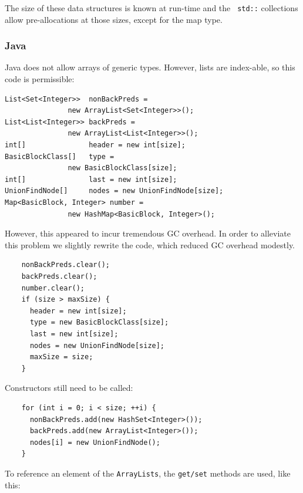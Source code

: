 The size of these data structures is known at run-time and the {\tt
  std::} collections allow pre-allocations at those sizes, except for
the map type.

\subsubsection{Java} 

Java does not allow arrays of generic types. However, lists are
index-able, so this code is permissible:

\begin{footnotesize}
\begin{verbatim}
List<Set<Integer>>  nonBackPreds = 
               new ArrayList<Set<Integer>>();
List<List<Integer>> backPreds = 
               new ArrayList<List<Integer>>();
int[]               header = new int[size];
BasicBlockClass[]   type = 
               new BasicBlockClass[size];
int[]               last = new int[size];
UnionFindNode[]     nodes = new UnionFindNode[size];
Map<BasicBlock, Integer> number = 
               new HashMap<BasicBlock, Integer>();
\end{verbatim}
\end{footnotesize}

However, this appeared to incur tremendous GC overhead. In order to
alleviate this problem we slightly rewrite the code, which reduced GC
overhead modestly.

\begin{footnotesize}
\begin{verbatim}
    nonBackPreds.clear();
    backPreds.clear();
    number.clear();
    if (size > maxSize) {
      header = new int[size];
      type = new BasicBlockClass[size];
      last = new int[size];
      nodes = new UnionFindNode[size];
      maxSize = size;
    }
\end{verbatim}
\end{footnotesize}

Constructors still need to be called:

\begin{footnotesize}
\begin{verbatim}
    for (int i = 0; i < size; ++i) {
      nonBackPreds.add(new HashSet<Integer>());
      backPreds.add(new ArrayList<Integer>());
      nodes[i] = new UnionFindNode();
    }
\end{verbatim}
\end{footnotesize}

To reference an element of the {\tt ArrayLists},  the {\tt get/set}
methods are used, like this:

